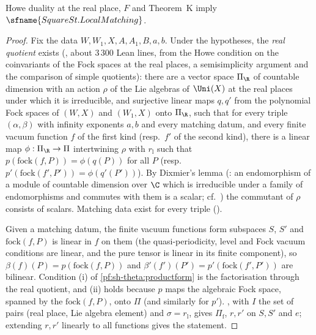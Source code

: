 \begin{theorem}\label{pf:sh-theta:sqlmthm}
Howe duality at the real place, $F$ and Theorem~K imply $\sfname{SquareSt.LocalMatching}$.
\end{theorem}

\begin{proof}
Fix the data $W,W_1,X,A,A_1,B,a,b$. Under the hypotheses, the \emph{real quotient} exists
(, about $3\,300$ Lean lines, from the Howe condition on the coinvariants of the
Fock spaces at the real places, a semisimplicity argument and the comparison of simple quotients): there are a vector space
$\Pi_\R$ of countable dimension with an action $\rho$ of the Lie algebras of $\Uni(X)$ at the real places under which it is
irreducible, and surjective linear maps $q,q'$ from the polynomial Fock spaces of $(W,X)$ and $(W_1,X)$ onto $\Pi_\R$, such that
for every triple $(\alpha,\beta)$ with infinity exponents $a,b$ and every matching datum, and every finite vacuum function $f$ of
the first kind (resp.\ $f'$ of the second kind), there is a linear map $\phi:\Pi_\R\to\Pi$ intertwining $\rho$ with $r_{\mathrm l}$
such that $p(\mathrm{fock}(f,P))=\phi(q(P))$ for all $P$ (resp.\ $p'(\mathrm{fock}(f',P'))=\phi(q'(P'))$). By Dixmier's lemma
(: an endomorphism of a module of countable dimension over $\C$ which is
irreducible under a family of endomorphisms and commutes with them is a scalar; cf.\ \cite{Dixmier1974}) the commutant of $\rho$
consists of scalars. Matching data exist for every triple ().

Given a matching datum, the finite vacuum functions form subspaces $S$, $S'$ and $\mathrm{fock}(f,P)$ is linear in $f$ on them
(the quasi-periodicity, level and Fock vacuum conditions are linear, and the pure tensor is linear in its finite component), so
$\beta(f)(P)=p(\mathrm{fock}(f,P))$ and $\beta'(f')(P')=p'(\mathrm{fock}(f',P'))$
are bilinear. Condition (i) of \cref{pf:sh-theta:productform} is the factorisation through the real quotient, and (ii) holds
because $p$ maps the algebraic Fock space, spanned by the $\mathrm{fock}(f,P)$, onto $\Pi$ (and similarly for $p'$).
, with $I$ the set of pairs (real place, Lie algebra element) and $\sigma=r_{\mathrm l}$, gives
$\Pi_{\mathrm f}$, $r,r'$ on $S,S'$ and $e$; extending $r,r'$ linearly to all functions gives the statement.
\end{proof}

